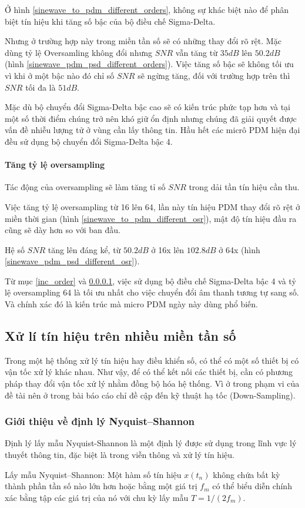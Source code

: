 Ở hình \ref{sinewave_to_pdm_different_orders}, không sự khác biệt nào để phân biệt tín hiệu khi tăng số bậc của bộ điều chế Sigma-Delta. 

Nhưng ở trường hợp này trong miền tần số sẽ có những thay đổi rõ rệt. Mặc dùng tỷ lệ Oversamling không đổi nhưng $SNR$ vẫn tăng từ $35dB$ lên $50.2dB$ (hình \ref{sinewave_pdm_psd_different_orders}).  Việc tăng số bậc sẽ không tối ưu vì khi ở một bậc nào đó chỉ số $SNR$ sẽ ngừng tăng, đối với trường hợp trên thì $SNR$ tối đa là $51dB$.

Mặc dù bộ chuyển đổi Sigma-Delta bậc cao sẽ có kiến trúc phức tạp hơn và tại một số thời điểm chúng trở nên khó giữ ổn định nhưng chúng đã giải quyết được vấn đề nhiễu lượng tử ở vùng cần lấy thông tin. Hầu hết các micrô PDM hiện đại đều sử dụng bộ chuyển đổi Sigma-Delta bậc 4.


\paragraph{Tăng tỷ lệ oversampling} \label{inc_sam}
Tác động của oversampling sẽ làm tăng tỉ số $SNR$ trong dải tần tín hiệu cần thu.

Việc tăng tỷ lệ oversampling từ 16 lên 64, lần này tín hiệu PDM thay đổi rõ rệt ở miền thời gian (hình \ref{sinewave_to_pdm_different_osr}), mật độ tín hiệu đầu ra cũng sẽ dày hơn so với ban đầu.

Hệ số $SNR$ tăng lên đáng kể, từ $50.2dB$ ở 16x lên $102.8dB$ ở 64x (hình \ref{sinewave_pdm_psd_different_osr}).

Từ mục \ref{inc_order} và \ref{inc_sam}, việc sử dụng bộ điều chế Sigma-Delta bậc 4 và tỷ lệ oversampling 64 là tối ưu nhất cho việc chuyển đổi âm thanh tương tự sang số. Và chính xác đó là kiến trúc mà micro PDM ngày này dùng phổ biến.

\subsection{Xử lí tín hiệu trên nhiều miền tần số}\label{xulynhieumientanso}
Trong một hệ thống xử lý tín hiệu hay điều khiển số, có thể có
một số thiết bị có vận tốc xử lý khác nhau. Như vậy, để có thể kết nối
các thiết bị, cần có phương pháp thay đổi vận tốc xử lý nhằm đồng
bộ hóa hệ thống. Vì ở trong phạm vi của đề tài nên ở trong bài báo cáo chỉ đề cập đến kỹ thuật hạ tốc (Down-Sampling).
\subsubsection{Giới thiệu về định lý Nyquist–Shannon}
Định lý lấy mẫu Nyquist-Shannon là một định lý được sử dụng trong lĩnh vực lý thuyết thông tin, đặc biệt là trong viễn thông và xử lý tín hiệu.
\begin{theorem}\label{dlnq} %
 Lấy mẫu Nyquist–Shannon: Một hàm số tín hiệu $x(t_n)$ không chứa bất kỳ thành phần tần số nào lớn hơn hoặc bằng một giá trị $f_m$ có thể biểu diễn chính xác bằng tập các giá trị của nó với chu kỳ lấy mẫu $T=1/(2f_m)$.
\end{theorem}

